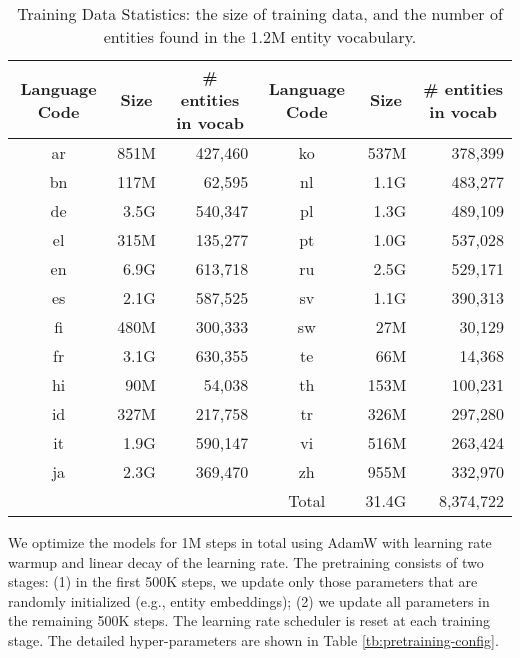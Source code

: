 \documentclass[11pt]{article}
\newcommand{\minisection}[1]{\noindent{\bf {#1}.}}
\begin{document}
\begin{table}[h]
  \centering
  \begin{tabular}{crr|crr} \toprule
  Language Code & \multicolumn{1}{c}{Size} & \multicolumn{1}{c|}{\# entities in vocab} & Language Code & \multicolumn{1}{c}{Size} & \multicolumn{1}{c}{\# entities in vocab} \\ \midrule
  ar & 851M & 427,460 &  ko & 537M & 378,399 \\
  bn & 117M & 62,595  &  nl & 1.1G & 483,277 \\
  de & 3.5G & 540,347 &  pl & 1.3G & 489,109 \\
  el & 315M & 135,277 &  pt & 1.0G & 537,028 \\
  en & 6.9G & 613,718 &  ru & 2.5G & 529,171 \\
  es & 2.1G & 587,525 &  sv & 1.1G & 390,313 \\
  fi & 480M & 300,333 &  sw &  27M & 30,129 \\
  fr & 3.1G & 630,355 &  te &  66M & 14,368 \\
  hi &  90M & 54,038  &  th & 153M & 100,231 \\
  id & 327M & 217,758 &  tr & 326M & 297,280 \\
  it & 1.9G & 590,147 &  vi & 516M & 263,424 \\
  ja & 2.3G & 369,470 &  zh & 955M & 332,970 \\ \midrule
     &      &        &  Total & 31.4G & 8,374,722 \\ \bottomrule
  \end{tabular}
  \caption{Training Data Statistics: the size of training data, and the number of entities found in the 1.2M entity vocabulary.}
  \label{table:data_stat}
\end{table}

\minisection{Optimization}
We optimize the \mluke{} models for 1M steps in total using AdamW \citep{DBLP:conf/iclr/LoshchilovH19} with learning rate warmup and linear decay of the learning rate.
The pretraining consists of two stages: (1) in the first 500K steps, we update only those parameters that are randomly initialized (e.g., entity embeddings); (2) we update all parameters in the remaining 500K steps.
The learning rate scheduler is reset at each training stage.
The detailed hyper-parameters are shown in Table \ref{tb:pretraining-config}.
\end{document}
